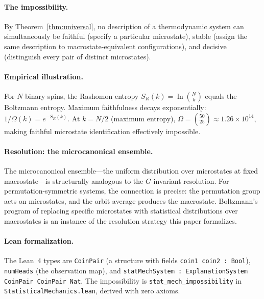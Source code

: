 \paragraph{The impossibility.}
By Theorem~\ref{thm:universal}, no description of a thermodynamic system can
simultaneously be faithful (specify a particular microstate), stable (assign the
same description to macrostate-equivalent configurations), and decisive
(distinguish every pair of distinct microstates).

\paragraph{Empirical illustration.}
For $N$ binary spins, the Rashomon entropy $S_R(k) = \ln \binom{N}{k}$ equals
the Boltzmann entropy.  Maximum faithfulness decays exponentially:
$1/\Omega(k) = e^{-S_R(k)}$.  At $k = N/2$ (maximum entropy),
$\Omega = \binom{50}{25} \approx 1.26 \times 10^{14}$, making faithful
microstate identification effectively impossible.

\paragraph{Resolution: the microcanonical ensemble.}
The microcanonical ensemble---the uniform distribution over microstates at fixed
macrostate---is structurally analogous to the $G$-invariant resolution.  For
permutation-symmetric systems, the connection is precise: the permutation group
acts on microstates, and the orbit average produces the macrostate.  Boltzmann's
program of replacing specific microstates with statistical distributions over
macrostates is an instance of the resolution strategy this paper formalizes.

\paragraph{Lean formalization.}
The Lean~4 types are \texttt{CoinPair} (a structure with fields
\texttt{coin1 coin2 : Bool}), \texttt{numHeads} (the observation map),
and \texttt{statMechSystem : ExplanationSystem CoinPair CoinPair Nat}.
The impossibility is \texttt{stat\_mech\_impossibility} in
\texttt{StatisticalMechanics.lean}, derived with zero axioms.
